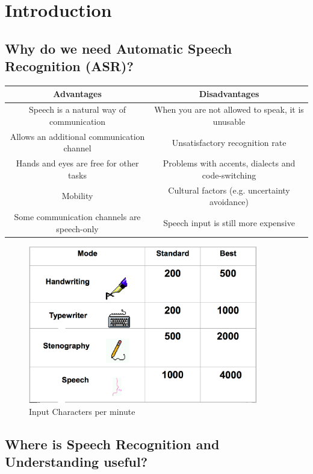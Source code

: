 \documentclass[11pt]{article}
\begin{document}
\newpage

\section{Introduction}

\subsection{Why do we need Automatic Speech Recognition (ASR)?}

\begin{center}
  \begin{tabular}{ c | c }
    \hline
    Advantages & Disadvantages  \\ \hline
    Speech is a natural way of communication & When you are not allowed to speak, it is unusable   \\
    Allows an additional communication channel   & Unsatisfactory recognition rate  \\
    Hands and eyes are free for other tasks & Problems with accents, dialects and code-switching   \\
    Mobility & Cultural factors (e.g. uncertainty avoidance)   \\
    Some communication channels are speech-only & Speech input is still more expensive   \\
    \hline
  \end{tabular}
\end{center}

\begin{figure}[ht]
\centering
\includegraphics[width=10cm]{images/Input.png}
\caption{Input Characters per minute}
\label{fig:inputCharacters}
\end{figure}

\subsection{Where is Speech Recognition and Understanding useful?}
\end{document}
